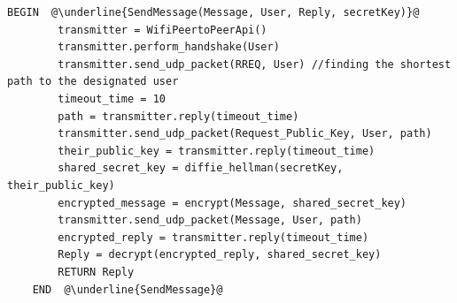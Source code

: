 \documentclass[a4paper, titlepage]{article}
\begin{document}
\begin{lstlisting}[caption=Send Data Packets over Network, escapechar=\@]
	BEGIN  @\underline{SendMessage(Message, User, Reply, secretKey)}@
		transmitter = WifiPeertoPeerApi()
		transmitter.perform_handshake(User)
		transmitter.send_udp_packet(RREQ, User) //finding the shortest path to the designated user
		timeout_time = 10
		path = transmitter.reply(timeout_time)
		transmitter.send_udp_packet(Request_Public_Key, User, path)
		their_public_key = transmitter.reply(timeout_time)
		shared_secret_key = diffie_hellman(secretKey, their_public_key)
		encrypted_message = encrypt(Message, shared_secret_key)
		transmitter.send_udp_packet(Message, User, path)
		encrypted_reply = transmitter.reply(timeout_time)
		Reply = decrypt(encrypted_reply, shared_secret_key)
		RETURN Reply
	END  @\underline{SendMessage}@
			
\end{lstlisting}

\vspace{7mm}



\renewcommand{\rmdefault}{cmr}
\end{document}
